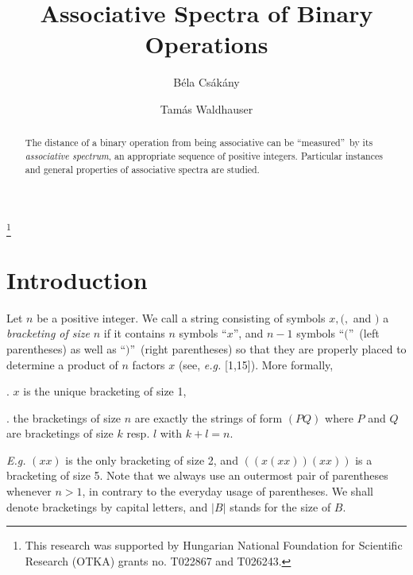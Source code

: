 \documentclass[a4paper,reqno]{amsart}\usepackage{amssymb,latexsym}
\theoremstyle{definition}
\theoremstyle{remark}
\numberwithin{equation}{section}
\numberwithin{theorem}{section}
\begin{document}
\title[Associative Spectra]{Associative Spectra of Binary Operations}
\author{B\'{e}la Cs\'{a}k\'{a}ny}
\address[B\'{e}la Cs\'{a}k\'{a}ny]{Bolyai Institute, University of Szeged, Aradi v\'{e}rtan\'{u}k tere 1, H-6720
Szeged, Hungary}
\author{Tam\'{a}s Waldhauser}
\address[Tam\'{a}s Waldhauser]{Bolyai Institute, University of Szeged, Aradi v\'{e}rtan\'{u}k tere 1, H-6720
Szeged, Hungary}
\thanks{This research was supported by Hungarian National Foundation for Scientific
Research (OTKA) grants no. T022867 and T026243.}

\begin{abstract}
The distance of a binary operation from being associative can be
\textquotedblleft measured\textquotedblright\ by its \textit{associative
spectrum}, an appropriate sequence of positive integers. Particular instances
and general properties of associative spectra are studied.

\end{abstract}
\maketitle

\section{Introduction}

Let $n$ be a positive integer. We call a string consisting of symbols $x,(,$
and $)$ a \textit{bracketing of size }$n$ if it contains $n$ symbols
\textquotedblleft$x$\textquotedblright, and $n-1$ symbols \textquotedblleft$($\textquotedblright\ (left parentheses) as well as \textquotedblleft$)$\textquotedblright\ (right parentheses) so that they are properly placed to
determine a product of $n$ factors $x$ (see, \textit{e.g.} [1,15]). More formally,

\smallskip

. $x$ is the unique bracketing of size 1,

. the bracketings of size $n$ are exactly the strings of form $(PQ)$
where $P$ and $Q$ are bracketings of size $k$ resp. $l$ with $k+l=n$.

\smallskip

\textit{E.g.} $(xx)$ is the only bracketing of size 2, and $((x(xx))(xx))$ is
a bracketing of size 5. Note that we always use an outermost pair of
parentheses whenever $n>1$, in contrary to the everyday usage of parentheses.
We shall denote bracketings by capital letters, and $|B|$ stands for the size
of $B$.
\end{document}

